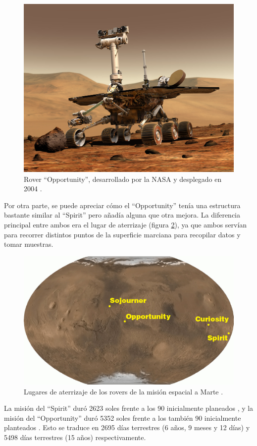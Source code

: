 \begin{figure}[H]
    \centering
    \includegraphics[width=.5\linewidth]{pictures/opportunity.jpg}
    \caption{Rover ``Opportunity'', desarrollado por la NASA y desplegado en 2004 \cite{OpportunityRover2020a}.}
    \label{fig:opportunity}
\end{figure}

Por otra parte, se puede apreciar cómo el ``Opportunity'' tenía una estructura bastante
similar al ``Spirit'' pero añadía alguna que otra mejora. La diferencia principal entre ambos 
era el lugar de aterrizaje (figura \ref{fig:landing_sites}), ya que ambos servían para 
recorrer distintos puntos de la superficie marciana para recopilar datos y tomar muestras.

\begin{figure}[H]
    \centering
    \includegraphics[width=.75\linewidth]{pictures/rover-landing-sites.en.jpg}
    \caption{Lugares de aterrizaje de los rovers de la misión espacial a Marte \cite{MarsRoversSpirita}.}
    \label{fig:landing_sites}
\end{figure}

La misión del ``Spirit'' duró 2623 soles frente a los 90 inicialmente planeados \cite{SpiritRover2020a},
y la misión del ``Opportunity'' duró 5352 soles frente a los también 90 inicialmente planteados \cite{OpportunityRover2020a}.
Esto se traduce en 2695 días terrestres (6 años, 9 meses y 12 días) y 5498 días terrestres (15 años)
respectivamente.

